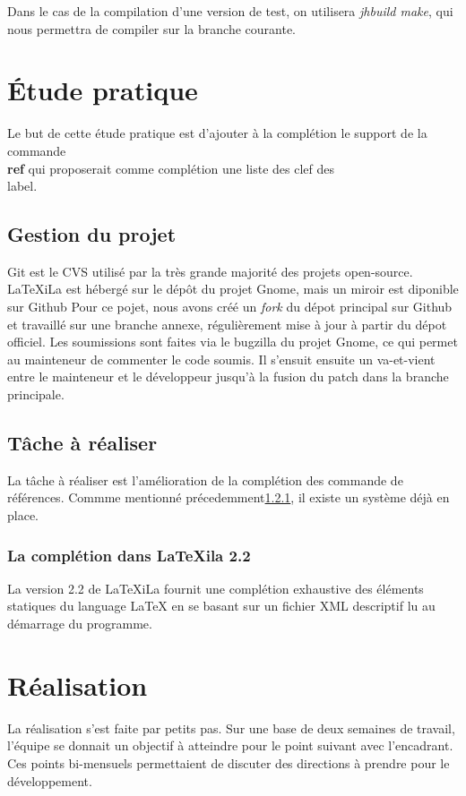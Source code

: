 \documentclass[a4paper,11pt]{report}
\begin{document}
Dans le cas de la compilation d'une version de test, on utilisera \textit{jhbuild make}, qui nous permettra de compiler sur la branche courante.

\chapter{Étude pratique} %
\label{cha:etude_pratique}
Le but de cette étude pratique est d'ajouter à la complétion le support de la commande \textbf{\\ref} qui proposerait comme complétion une liste des clef des \\label. 

\section{Gestion du projet} %
\label{sec:git}
Git est le CVS utilisé par la très grande majorité des projets open-source. LaTeXiLa est hébergé sur le dépôt du projet Gnome, mais un miroir est diponible sur Github %
Pour ce pojet, nous avons créé un \textit{fork} du dépot principal sur Github et travaillé sur une branche annexe, régulièrement mise à jour à partir du dépot officiel.
Les soumissions sont faites via le bugzilla du projet Gnome, ce qui permet au mainteneur de commenter le code soumis. Il s'ensuit ensuite un va-et-vient entre le mainteneur et le développeur jusqu'à la fusion du patch dans la branche principale.

\section{Tâche à réaliser} %
\label{sec:tache_a_realiser}
La tâche à réaliser est l'amélioration de la complétion des commande de références. Commme mentionné précedemment\ref{sub:completion}, il existe un système déjà en place.


\subsection{La complétion dans LaTeXila 2.2}
\label{sub:completion}
La version 2.2 de LaTeXiLa fournit une complétion exhaustive des éléments statiques du language LaTeX en se basant sur un fichier XML descriptif lu au démarrage du programme. 



\chapter{Réalisation}
La réalisation s'est faite par petits pas. Sur une base de deux semaines de travail, l'équipe se donnait un objectif à atteindre pour le point suivant avec l'encadrant.
Ces points bi-mensuels permettaient de discuter des directions à prendre pour le développement.
\end{document}

